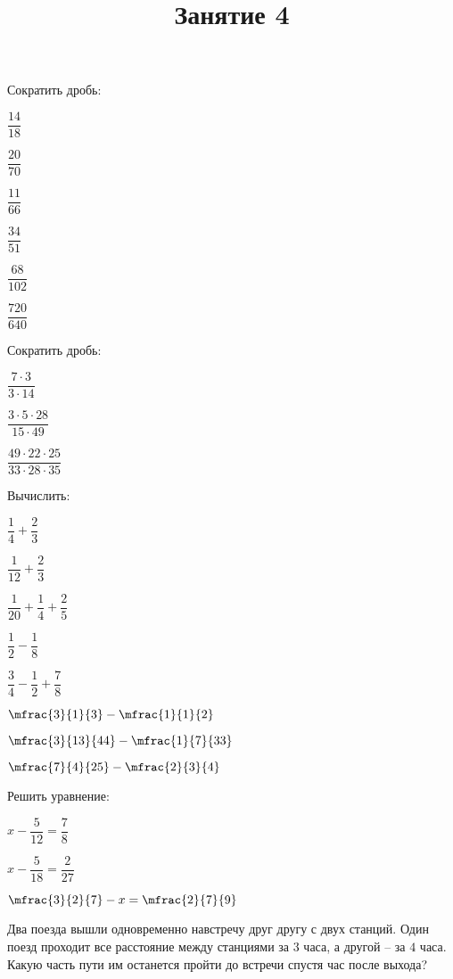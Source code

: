 \title{Занятие 4}
\begin{listofex}
	\item Сократить дробь:
	\begin{enumcols}[itemcolumns=6]
		\item \( \dfrac{14}{18} \)
		\item \( \dfrac{20}{70} \)
		\item \( \dfrac{11}{66} \)
		\item \( \dfrac{34}{51} \)
		\item \( \dfrac{68}{102} \)
		\item \( \dfrac{720}{640} \)
	\end{enumcols}
	\item Сократить дробь:
	\begin{enumcols}[itemcolumns=3]
		\item \( \dfrac{7\cdot3}{3\cdot14} \)
		\item \( \dfrac{3\cdot5\cdot28}{15\cdot49} \)
		\item \( \dfrac{49\cdot22\cdot25}{33\cdot28\cdot35} \)
	\end{enumcols}
	\item Вычислить:
	\begin{enumcols}[itemcolumns=4]
		\item \( \dfrac{1}{4}+\dfrac{2}{3} \)
		\item \( \dfrac{1}{12}+\dfrac{2}{3} \)
		\item \( \dfrac{1}{20}+\dfrac{1}{4}+\dfrac{2}{5} \)
		\item \( \dfrac{1}{2}-\dfrac{1}{8} \)
		\item \( \dfrac{3}{4}-\dfrac{1}{2}+\dfrac{7}{8} \)
		\item \( \mfrac{3}{1}{3}-\mfrac{1}{1}{2} \)
		\item \( \mfrac{3}{13}{44}-\mfrac{1}{7}{33} \)
		\item \( \mfrac{7}{4}{25}-\mfrac{2}{3}{4} \)
	\end{enumcols}
	\item Решить уравнение:
	\begin{enumcols}[itemcolumns=3]
		\item \( x-\dfrac{5}{12}=\dfrac{7}{8} \)
		\item \( x-\dfrac{5}{18}=\dfrac{2}{27} \)
		\item \( \mfrac{3}{2}{7}-x=\mfrac{2}{7}{9} \)
	\end{enumcols}
	\item Два поезда вышли одновременно навстречу друг другу с двух станций. Один поезд проходит все расстояние между станциями за \( 3 \) часа, а другой -- за \( 4 \) часа. Какую часть пути им останется пройти до встречи спустя час после выхода?
\end{listofex}
